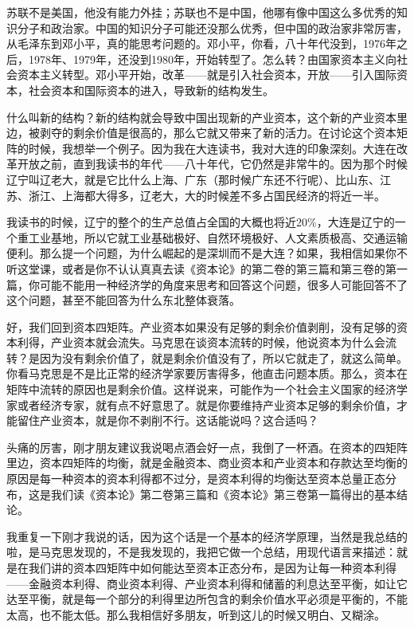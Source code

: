\documentclass[UTF8, 12pt, a4paper]{ctexrep}
\begin{document}
苏联不是美国，他没有能力外挂；苏联也不是中国，他哪有像中国这么多优秀的知识分子和政治家。中国的知识分子可能还没那么优秀，但中国的政治家非常厉害，从毛泽东到邓小平，真的能思考问题的。邓小平，你看，八十年代没到，1976年之后，1978年、1979年，还没到1980年，开始转型了。怎么转？由国家资本主义向社会资本主义转型。邓小平开始，改革——就是引入社会资本，开放——引入国际资本，社会资本和国际资本的进入，导致新的结构发生。

什么叫新的结构？新的结构就会导致中国出现新的产业资本，这个新的产业资本里边，被剥夺的剩余价值是很高的，那么它就又带来了新的活力。在讨论这个资本矩阵的时候，我想举一个例子。因为我在大连读书，我对大连的印象深刻。大连在改革开放之前，直到我读书的年代——八十年代，它仍然是非常牛的。因为那个时候辽宁叫辽老大，就是它比什么上海、广东（那时候广东还不行呢）、比山东、江苏、浙江、上海都大得多，辽老大，大的时候差不多占国民经济的将近一半。

我读书的时候，辽宁的整个的生产总值占全国的大概也将近20\%，大连是辽宁的一个重工业基地，所以它就工业基础极好、自然环境极好、人文素质极高、交通运输便利。那么提一个问题，为什么崛起的是深圳而不是大连？如果，我相信如果你不听这堂课，或者是你不认认真真去读《资本论》的第二卷的第三篇和第三卷的第一篇，你可能不能用一种经济学的角度来思考和回答这个问题，很多人可能回答不了这个问题，甚至不能回答为什么东北整体衰落。

好，我们回到资本四矩阵。产业资本如果没有足够的剩余价值剥削，没有足够的资本利得，产业资本就会流失。马克思在谈资本流转的时候，他说资本为什么会流转？是因为没有剩余价值了，就是剩余价值没有了，所以它就走了，就这么简单。你看马克思是不是比正常的经济学家要厉害得多，他直击问题本质。那么，资本在矩阵中流转的原因也是剩余价值。这样说来，可能作为一个社会主义国家的经济学家或者经济专家，就有点不好意思了。就是你要维持产业资本足够的剩余价值，才能留住产业资本，就是你不剥削不行。这话能说吗？这合适吗？

头痛的厉害，刚才朋友建议我说喝点酒会好一点，我倒了一杯酒。在资本的四矩阵里边，资本四矩阵的均衡，就是金融资本、商业资本和产业资本和存款达至均衡的原因是每一种资本的资本利得都不过分，是资本利得的均衡达至资本总量正态分布，这是我们读《资本论》第二卷第三篇和《资本论》第三卷第一篇得出的基本结论。

我重复一下刚才我说的话，因为这个话是一个基本的经济学原理，当然是我总结的啦，是马克思发现的，不是我发现的，我把它做一个总结，用现代语言来描述：就是在我们讲的资本四矩阵中如何能达至资本正态分布，是因为让每一种资本利得——金融资本利得、商业资本利得、产业资本利得和储蓄的利息达至平衡，如让它达至平衡，就是每一个部分的利得里边所包含的剩余价值水平必须是平衡的，不能太高，也不能太低。那么我相信好多朋友，听到这儿的时候又明白、又糊涂。
\end{document}
